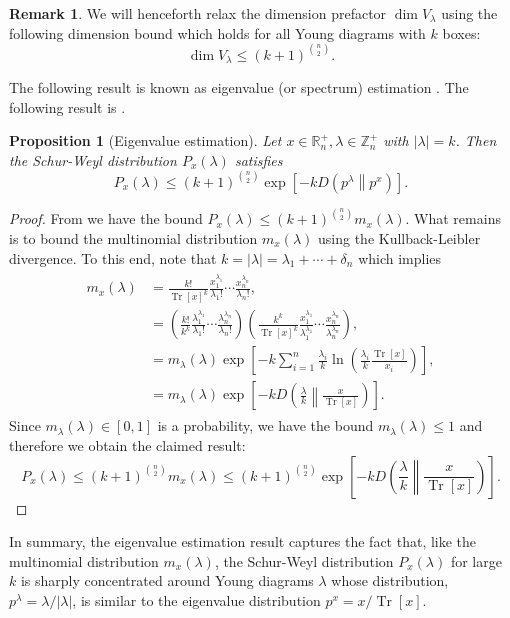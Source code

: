 \documentclass[notitlepage, 11pt, letterpaper]{amsart}
\theoremstyle{plain}
\newtheorem{prop}[thm]{Proposition}
\theoremstyle{definition}
\newtheorem{rem}[thm]{Remark}%
\let\cref\crtcref
\DeclareMathOperator{\Tr}{Tr}
\newcommand{\polyk}[1]{(k\!+\!1)^{#1}}
\newcommand{\kl}[2]{D\!\left(#1\middle\|#2\right)} %
\newcommand{\SW}[1]{P_{#1}}
\newcommand{\undomweightsp}[1]{\mathbb Z^{+}_{#1}}
\newcommand{\eigsp}[1]{\mathbb R^{+}_{#1}}
\newcommand{\ex}{x}
\newcommand{\tex}{\Tr[\ex]}
\newcommand{\yd}{\delta}
\newcommand{\yx}{\lambda}
\newcommand{\syx}{|\yx|}
\begin{document}
\begin{rem}
    We will henceforth relax the dimension prefactor $\dim V_{\yx}$ using the following dimension bound which holds for all Young diagrams with $k$ boxes:
    \begin{equation}
        \label{eq:unitary_irrep_dim_bound}
        \dim V_{\yx} \leq \polyk{\binom{n}{2}}.
    \end{equation}
\end{rem}
The following result is known as eigenvalue (or spectrum) estimation \cite{alicki1988symmetry,keyl2001estimating,hayashi2002quantum,odonnell2016efficient}.
The following result is \cite[Theorem 1]{christandl2006spectra}.
\begin{prop}[Eigenvalue estimation]
    \label{prop:eig_est}
    Let $x \in \eigsp{n}, \yx \in \undomweightsp{n}$ with $\syx = k$.
    Then the Schur-Weyl distribution $\SW{\ex}(\yx)$ satisfies
    \begin{equation}
        \SW{\ex}(\yx) \leq \polyk{\binom{n}{2}} \exp\left[-k \kl{p^{\yx}}{p^\ex}\right].
    \end{equation}
\end{prop}
\begin{proof}
    From \cref{prop:multinomial_bound} we have the bound $\SW{\ex}(\yx) \leq \polyk{\binom{n}{2}} m_{\ex}(\yx)$.
    What remains is to bound the multinomial distribution $m_{\ex}(\yx)$ using the Kullback-Leibler divergence.
    To this end, note that $k = \syx = \yx_1 + \cdots + \yd_n$ which implies
    \begin{align}
        \begin{split}
            m_{\ex}(\yx)
            &= \frac{k!}{\tex^{k}}\frac{\ex_1^{\yx_1}}{\yx_1!}\cdots \frac{\ex_n^{\yx_n}}{\yx_n!}, \\
            &= \left(\frac{k!}{k^{k}} \frac{\yx_1^{\yx_1}}{\yx_1!} \cdots \frac{\yx_n^{\yx_n}}{\yx_n!}\right)
            \left(\frac{k^{k}}{\tex^{k}}\frac{\ex_1^{\yx_1}}{\yx_1^{\yx_1}}\cdots \frac{\ex_n^{\yx_n}}{\yx_n^{\yx_n}}\right), \\
            &= m_{\yx}(\yx)
            \exp\left[ - k \sum_{i=1}^{n} \frac{\yx_i}{k} \ln \left(\frac{\yx_i}{k} \frac{\tex}{\ex_i}\right)  \right], \\
            &= m_{\yx}(\yx)
            \exp\left[ - k \kl{\frac{\yx}{k}}{\frac{\ex}{\tex}} \right].
        \end{split}
    \end{align}
    Since $m_{\yx}(\yx) \in [0,1]$ is a probability, we have the bound $m_{\yx}(\yx) \leq 1$ and therefore we obtain the claimed result:
    \begin{equation}
        \SW{\ex}(\yx) \leq \polyk{\binom{n}{2}} m_{\ex}(\yx) \leq \polyk{\binom{n}{2}}\exp\left[ - k \kl{\frac{\yx}{k}}{\frac{\ex}{\tex}} \right].
    \end{equation}
\end{proof}
In summary, the eigenvalue estimation result captures the fact that, like the multinomial distribution $m_x(\yx)$, the Schur-Weyl distribution $\SW{\ex}(\yx)$ for large $k$ is sharply concentrated around Young diagrams $\yx$ whose distribution, $p^{\yx} = \yx/\syx$, is similar to the eigenvalue distribution $p^{\ex} = \ex/\tex$.
\end{document}
